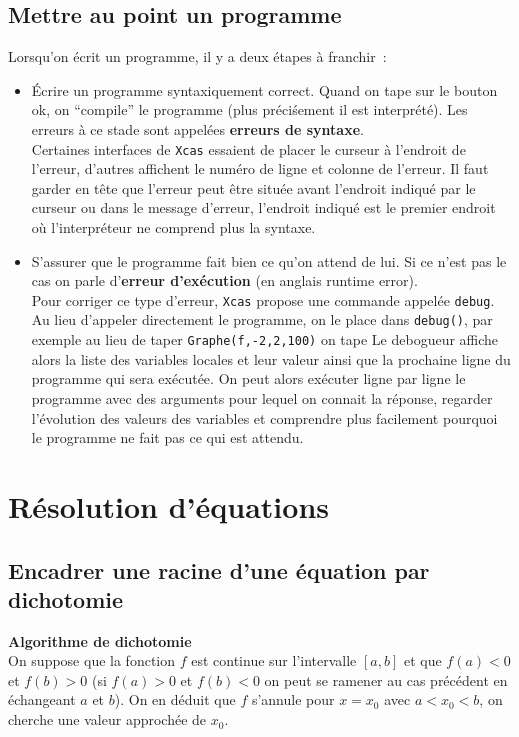 \documentclass[12pt,a4paper]{book}
\begin{document}
\begin{giacjshere}
\section{Mettre au point un programme}
Lorsqu'on \'ecrit un programme, il y a deux \'etapes
\`a franchir~:
\begin{itemize}
\item \'Ecrire un programme syntaxiquement correct. Quand on
tape sur le bouton ok, on ``compile'' le programme 
(plus pr\'eci\'sement il est interpr\'et\'e).  
Les erreurs \`a ce stade sont appel\'ees
{\bf erreurs de syntaxe}.\\
Certaines interfaces de {\tt Xcas} essaient de placer
le curseur \`a l'endroit de l'erreur, d'autres affichent le num\'ero
de ligne et colonne de l'erreur. Il faut garder en t\^ete que
l'erreur peut \^etre situ\'ee avant l'endroit indiqu\'e par le curseur
ou dans le message d'erreur, l'endroit indiqu\'e est le premier endroit
o\`u l'interpr\'eteur ne comprend plus la syntaxe.
\item S'assurer que le programme fait bien ce qu'on attend de lui.
Si ce n'est pas le cas on parle d'{\bf erreur 
d'ex\'ecution} 
(en anglais runtime error). \\
Pour corriger ce type d'erreur, {\tt Xcas}
propose une commande appel\'ee \verb|debug|. Au lieu d'appeler
directement le programme, on le place dans \verb|debug()|,
par exemple au lieu de taper \verb|Graphe(f,-2,2,100)|
on tape 
Le debogueur affiche alors la liste des variables locales et leur valeur
ainsi que la prochaine ligne du programme qui sera ex\'ecut\'ee. On
peut alors ex\'ecuter ligne par ligne le programme avec des arguments
pour lequel on connait la r\'eponse, regarder l'\'evolution
des valeurs des variables et comprendre plus facilement pourquoi
le programme ne fait pas ce qui est attendu.
\end{itemize}

\chapter{R\'esolution d'\'equations}
\section{Encadrer une racine d'une \'equation par dichotomie} \label{sec:dichotomie}
{\bf Algorithme de dichotomie}\\
On suppose que la fonction $f$ est continue sur 
l'intervalle $[a,b]$ et que $f(a)<0$ et $f(b)>0$
(si $f(a)>0$ et $f(b)<0$ on peut se ramener au cas pr\'ec\'edent
en \'echangeant $a$ et $b$).
On en d\'eduit que $f$ s'annule pour $x=x_0$ avec $a<x_0<b$, 
on cherche une valeur approch\'ee de $x_0$.


\end{giacjshere}
\end{document}
